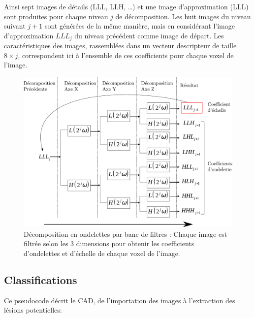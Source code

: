 Ainsi sept images de détails (LLL, LLH, \dots) et une image d’approximation (LLL) sont produites pour chaque niveau $j$ de décomposition. Les huit images du niveau suivant $j+1$ sont générées de la même manière, mais en considérant l’image d’approximation $LLL_j$ du niveau précédent comme image de départ. Les caractéristiques des images, rassemblées dans un vecteur descripteur de taille $8\times j$, correspondent ici à l’ensemble de ces coefficients pour chaque voxel  de l’image. 

\begin{figure}
 \label{fig:ondelettes}
 \includegraphics[width=15cm]{images/decompHotell}
 \caption{Décomposition en ondelettes par banc de filtres : Chaque image est filtrée selon les 3 dimensions pour obtenir les coefficients d'ondelettes et d'échelle de chaque voxel de l'image.}
\end{figure}

\subsection{Classifications}

Ce pseudocode décrit le CAD, de l'importation des images à l'extraction des lésions potentielles:

